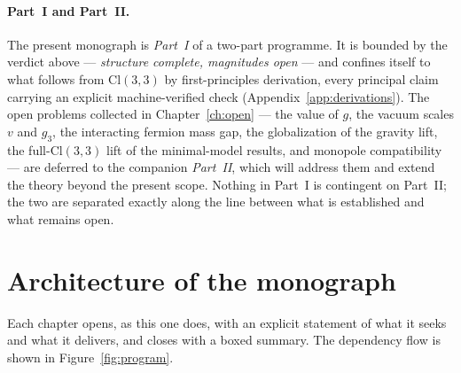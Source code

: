 \documentclass[11pt,oneside]{book}
\newcommand{\Cl}{\mathrm{Cl}}                     %
\theoremstyle{plain}
\theoremstyle{definition}
\theoremstyle{remark}
\begin{document}
\paragraph{Part~I and Part~II.} The present monograph is \emph{Part~I} of a two-part
programme. It is bounded by the verdict above --- \emph{structure complete, magnitudes
open} --- and confines itself to what follows from $\Cl(3,3)$ by first-principles
derivation, every principal claim carrying an explicit machine-verified check
(Appendix~\ref{app:derivations}). The open problems collected in
Chapter~\ref{ch:open} --- the value of $g$, the vacuum scales $v$ and $g_3$, the
interacting fermion mass gap, the globalization of the gravity lift, the
full-$\Cl(3,3)$ lift of the minimal-model results, and monopole compatibility --- are
deferred to the companion \emph{Part~II}, which will address them and extend the theory
beyond the present scope. Nothing in Part~I is contingent on Part~II; the two are
separated exactly along the line between what is established and what remains open.

\section{Architecture of the monograph}
\label{sec:architecture}

Each chapter opens, as this one does, with an explicit statement of what it seeks
and what it delivers, and closes with a boxed summary. The dependency flow is
shown in Figure~\ref{fig:program}.
\end{document}
